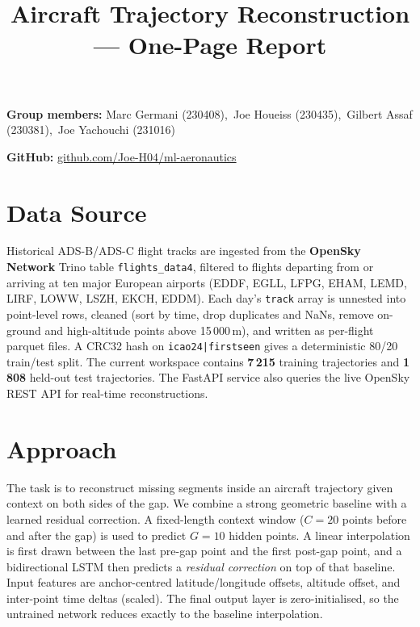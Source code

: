 \documentclass[11pt]{article}
\title{\vspace{-2.5em}Aircraft Trajectory Reconstruction --- One-Page Report}
\author{}
\date{}
\begin{document}
\maketitle
\vspace{-3.5em}

\begin{center}
\textbf{Group members:}
Marc Germani (230408),\ Joe Houeiss (230435),\ Gilbert Assaf (230381),\ Joe Yachouchi (231016)

\vspace{0.4em}
\textbf{GitHub:} \href{https://github.com/Joe-H04/ml-aeronautics}{github.com/Joe-H04/ml-aeronautics}
\end{center}

\section*{Data Source}
Historical ADS-B/ADS-C flight tracks are ingested from the \textbf{OpenSky Network} Trino table \texttt{flights\_data4}, filtered to flights departing from or arriving at ten major European airports (EDDF, EGLL, LFPG, EHAM, LEMD, LIRF, LOWW, LSZH, EKCH, EDDM). Each day's \texttt{track} array is unnested into point-level rows, cleaned (sort by time, drop duplicates and NaNs, remove on-ground and high-altitude points above 15\,000\,m), and written as per-flight parquet files. A CRC32 hash on \texttt{icao24|firstseen} gives a deterministic 80/20 train/test split. The current workspace contains \textbf{7\,215} training trajectories and \textbf{1\,808} held-out test trajectories. The FastAPI service also queries the live OpenSky REST API for real-time reconstructions.

\section*{Approach}
The task is to reconstruct missing segments inside an aircraft trajectory given context on both sides of the gap. We combine a strong geometric baseline with a learned residual correction. A fixed-length context window ($C = 20$ points before and after the gap) is used to predict $G = 10$ hidden points. A linear interpolation is first drawn between the last pre-gap point and the first post-gap point, and a bidirectional LSTM then predicts a \emph{residual correction} on top of that baseline. Input features are anchor-centred latitude/longitude offsets, altitude offset, and inter-point time deltas (scaled). The final output layer is zero-initialised, so the untrained network reduces exactly to the baseline interpolation.
\end{document}

